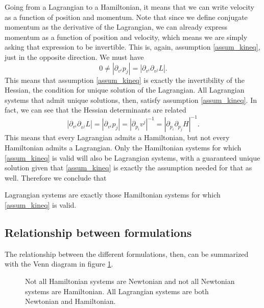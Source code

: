 Going from a Lagrangian to a Hamiltonian, it means that we can write velocity as a function of position and momentum. Note that since we define conjugate momentum as the derivative of the Lagrangian, we can already express momentum as a function of position and velocity, which means we are simply asking that expression to be invertible. This is, again, assumption \ref{assum_kineq}, just in the opposite direction. We must have
\begin{equation}
	0 \neq \left| \partial_{v^i} p_j \right| = \left| \partial_{v^i} \partial_{v^j} L \right|.
\end{equation}
This means that assumption \ref{assum_kineq} is exactly the invertibility of the Hessian, the condition for unique solution of the Lagrangian. All Lagrangian systems that admit unique solutions, then, satisfy assumption \ref{assum_kineq}. In fact, we can see that the Hessian determinants are related
\begin{equation}
	\left| \partial_{v^i} \partial_{v^j} L \right| = \left| \partial_{v^i} p_j \right| = \left| \partial_{p_i} v^j \right|^{-1} = \left|\partial_{p_i}\partial_{p_j} H\right|^{-1}.
\end{equation}
This means that every Lagrangian admits a Hamiltonian, but not every Hamiltonian admits a Lagrangian. Only the Hamiltonian systems for which \ref{assum_kineq} is valid will also be Lagrangian systems, with a guaranteed unique solution given that \ref{assum_kineq} is exactly the assumption needed for that as well. Therefore we conclude that
\begin{insight}
	Lagrangian systems are exactly those Hamiltonian systems for which \ref{assum_kineq} is valid.
\end{insight}

\subsection{Relationship between formulations}

The relationship between the different formulations, then, can be summarized with the Venn diagram in figure \ref{rp-cm-fig-vennDiagramEarly}.

\begin{figure}[h]
	\centering
	\caption {Not all Hamiltonian systems are Newtonian and not all Newtonian systems are Hamiltonian. All Lagrangian systems are both Newtonian and Hamiltonian.}\label{rp-cm-fig-vennDiagramEarly}
\end{figure}


